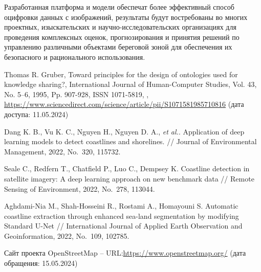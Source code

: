 \documentclass[732,fontsize=14pt,final]{studrep}
\begin{document}
Разработанная платформа и модели обеспечат более эффективный способ оцифровки данных с изображений, результаты будут востребованы во многих проектных, изыскательских и научно-исследовательских организациях для проведения комплексных оценок, прогнозирования и принятия решений по управлению различными объектами береговой зоной для обеспечения их безопасного и рационального использования.

\begin{thebibliography}{99}
   Thomas R. Gruber,
Toward principles for the design of ontologies used for knowledge sharing?,
International Journal of Human-Computer Studies,
Vol. 43, No. 5–6,
1995,
Pp. 907-928,
ISSN 1071-5819,
, \url{https://www.sciencedirect.com/science/article/pii/S1071581985710816} (дата доступа: 11.05.2024)

 Dang K. B., Vu K. C., Nguyen H., Nguyen D. A., \emph{et al.}. Application of deep learning models to detect coastlines and shorelines. // Journal of Environmental Management, 2022, No.~320, 115732.

 Seale C., Redfern T., Chatfield P., Luo C., Dempsey K. Coastline detection in satellite imagery: A deep learning approach on new benchmark data // Remote Sensing of Environment, 2022, No.~278, 113044.

 Aghdami-Nia M., Shah-Hosseini R., Rostami A., Homayouni S. Automatic coastline extraction through enhanced sea-land segmentation by modifying Standard U-Net // International Journal of Applied Earth Observation and Geoinformation, 2022, No.~109, 102785.

 Сайт проекта OpenStreetMap -- URL:\url{https://www.openstreetmap.org/} (дата обращения: 15.05.2024)


\end{thebibliography}
\end{document}
